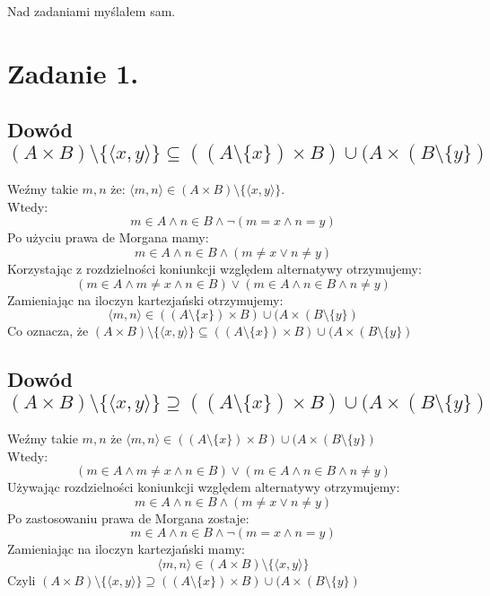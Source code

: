 \documentclass{article}
\begin{document}
\newcommand{\imp}{\Rightarrow}
\newcommand{\lub}{\vee}
\newcommand{\roz}{\setminus}
\newcommand{\zbp}{\emptyset}
\newcommand{\zbpot}{\mathcal{P}}
\newcommand{\troj}{\bigtriangleup}
\newcommand{\nat}{\mathbb{N}}
\newcommand{\rze}{\mathbb{R}}
\newcommand{\wegde}{\wedge}
\newcommand{\eps}{\varepsilon}
\maketitle
Nad zadaniami myślałem sam.
\section*{Zadanie 1.}
\subsection*{Dowód $(A \times B) \roz \{\langle x,y\rangle\} \subseteq (( A\roz  \{x\}) \times B) \cup (A\times (B\roz\{y\})$}
Weźmy takie $m,n$ że: $\langle m,n \rangle \in (A \times B) \roz \{\langle x,y\rangle\} $.\\ Wtedy: \[ m \in A \wedge n \in  B \wedge \lnot (m = x \wedge  n = y)\]
Po użyciu prawa de Morgana mamy: \[ m \in A \wedge n \in  B \wedge  (m \neq x \vee  n \neq y)\]
Korzystając z rozdzielności koniunkcji względem alternatywy otrzymujemy: 
\[ (m \in A \wedge m \neq x \wedge n \in  B  ) \vee ( m \in A \wedge n \in  B \wedge n \neq y)\]
Zamieniając na iloczyn kartezjański otrzymujemy:
\[\langle m,n \rangle \in (( A\roz  \{x\}) \times B) \cup (A\times (B\roz\{y\})\]
Co oznacza, że $(A \times B) \roz \{\langle x,y\rangle\} \subseteq (( A\roz  \{x\}) \times B) \cup (A\times (B\roz\{y\})$


\subsection*{Dowód $(A \times B) \roz \{\langle x,y\rangle\} \supseteq (( A\roz  \{x\}) \times B) \cup (A\times (B\roz\{y\})$}
Weźmy takie $m,n$ że $\langle m,n\rangle \in ((A\roz  \{x\}) \times B) \cup (A\times (B\roz\{y\})$\\
Wtedy:\[ (m \in A \wedge m \neq x \wedge n \in  B  ) \vee ( m \in A \wedge n \in  B \wedge n \neq y)\]
Używając rozdzielności koniunkcji względem alternatywy otrzymujemy:
\[ m \in A \wedge n \in  B \wedge  (m \neq x \vee  n \neq y)\]
Po zastosowaniu prawa de Morgana zostaje:
\[ m \in A \wedge n \in  B \wedge \lnot (m = x \wedge  n = y)\]
Zamieniając na iloczyn kartezjański mamy:\[\langle m,n \rangle \in (A \times B) \roz \{\langle x,y\rangle\}\]
Czyli $(A \times B) \roz \{\langle x,y\rangle\} \supseteq (( A\roz  \{x\}) \times B) \cup (A\times (B\roz\{y\})$
\end{document}
